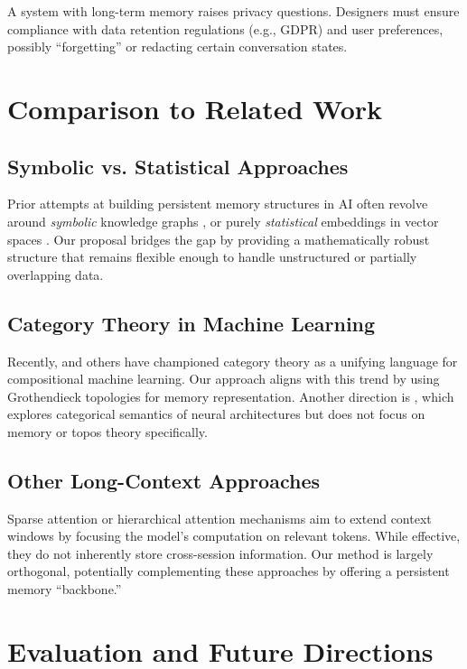 \documentclass{article}
\begin{document}
A system with long-term memory raises privacy questions. Designers must ensure compliance with data retention regulations (e.g., GDPR) and user preferences, possibly “forgetting” or redacting certain conversation states.

\section{Comparison to Related Work}
\label{sec:related_work}

\subsection{Symbolic vs. Statistical Approaches}

Prior attempts at building persistent memory structures in AI often revolve around \emph{symbolic} knowledge graphs \citep{ehrlinger2016towards}, or purely \emph{statistical} embeddings in vector spaces \citep{lewis2020retrieval}. Our proposal bridges the gap by providing a mathematically robust structure that remains flexible enough to handle unstructured or partially overlapping data.

\subsection{Category Theory in Machine Learning}

Recently, \citet{fong2019invitation} and others have championed category theory as a unifying language for compositional machine learning. Our approach aligns with this trend by using Grothendieck topologies for memory representation. Another direction is \citet{zanasi2022category}, which explores categorical semantics of neural architectures but does not focus on memory or topos theory specifically.

\subsection{Other Long-Context Approaches}

Sparse attention or hierarchical attention mechanisms \citep{beltagy2020longformer, ainslie2020etc} aim to extend context windows by focusing the model’s computation on relevant tokens. While effective, they do not inherently store cross-session information. Our method is largely orthogonal, potentially complementing these approaches by offering a persistent memory “backbone.”

\section{Evaluation and Future Directions}
\label{sec:evaluation}
\end{document}
